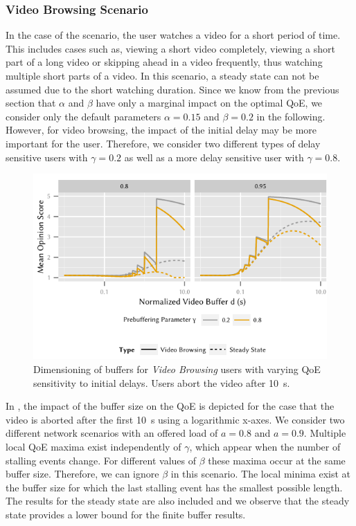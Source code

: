 \subsubsection*{Video Browsing Scenario}\label{sec:application:qoe_user_behaviour:typical_user_scenarios:browsing}

In the case of the \videoBrowsing scenario, the user watches a video for a short period of time. This includes cases such as, viewing a short video completely, viewing a short part of a long video or skipping ahead in a video frequently, thus watching multiple short parts of a video.
In this scenario, a steady state can not be assumed due to the short watching duration.
Since we know from the previous section that \(\alpha\) and \(\beta\) have only a marginal impact on the optimal \gls{QoE}, we consider only the default parameters \(\alpha=0.15\) and \(\beta=0.2\) in the following.
However, for video browsing, the impact of the initial delay may be more important for the user. Therefore, we consider two different types of delay sensitive users with \(\gamma=0.2\) as well as a more delay sensitive user with \(\gamma=0.8\).

\begin{figure}
  \centering
  \includegraphics{application/qoe_user_behaviour/user_scenarios/figures/video_browsing}
  \caption{Dimensioning of buffers for \emph{Video Browsing} users with varying \gls{QoE} sensitivity to initial delays. Users abort the video after \SI{10}{\second}.}
  \label{fig:application:qoe_user_behaviour:typical_user_scenarios:browsing:video_browsing}
\end{figure}

In , the impact of the buffer size on the \gls{QoE} is depicted for the case that the video is aborted after the first \SI{10}{\second} using a logarithmic x-axes. 
We consider two different network scenarios with an offered load of \(a = 0.8\) and \(a = 0.9\).
Multiple local QoE maxima exist independently of \(\gamma\), which appear when the number of stalling events change. 
For different values of \(\beta\) these maxima occur at the same buffer size.
Therefore, we can ignore \(\beta\) in this scenario. 
The local minima exist at the buffer size for which the last stalling event has the smallest possible length. 
The results for the steady state are also included and we observe that the steady state provides a lower bound for the finite buffer results.

